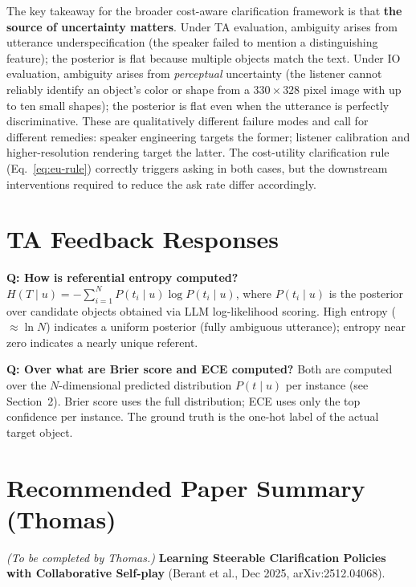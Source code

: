 \documentclass[11pt]{article}
\begin{document}
The key takeaway for the broader cost-aware clarification framework is that
\textbf{the source of uncertainty matters}.
Under TA evaluation, ambiguity arises from utterance underspecification
(the speaker failed to mention a distinguishing feature);
the posterior is flat because multiple objects match the text.
Under IO evaluation, ambiguity arises from \emph{perceptual} uncertainty
(the listener cannot reliably identify an object's color or shape from
a $330{\times}328$ pixel image with up to ten small shapes);
the posterior is flat even when the utterance is perfectly discriminative.
These are qualitatively different failure modes and call for different
remedies: speaker engineering targets the former; listener calibration
and higher-resolution rendering target the latter.
The cost-utility clarification rule (Eq.~\ref{eq:eu-rule}) correctly
triggers asking in both cases, but the downstream interventions required
to reduce the ask rate differ accordingly.

\section{TA Feedback Responses}

\textbf{Q: How is referential entropy computed?}
$H(T \mid u) = -\sum_{i=1}^{N} P(t_i \mid u)\log P(t_i \mid u)$,
where $P(t_i \mid u)$ is the posterior over candidate objects obtained via LLM
log-likelihood scoring.  High entropy ($\approx \ln N$) indicates a uniform posterior
(fully ambiguous utterance); entropy near zero indicates a nearly unique referent.

\textbf{Q: Over what are Brier score and ECE computed?}
Both are computed over the $N$-dimensional predicted distribution $P(t \mid u)$ per
instance (see Section~2).  Brier score uses the full distribution; ECE uses only the
top confidence per instance.  The ground truth is the one-hot label of the actual
target object.

\section{Recommended Paper Summary (Thomas)}

\textit{(To be completed by Thomas.)}
\textbf{Learning Steerable Clarification Policies with Collaborative Self-play}
(Berant et al., Dec 2025, arXiv:2512.04068).
\end{document}
